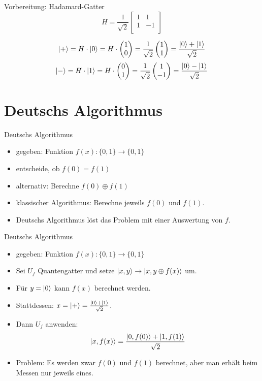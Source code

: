 \documentclass[xcolor=colortbl
,ngerman
]{beamer}
\begin{document}
\begin{frame}{Vorbereitung: Hadamard-Gatter}
    \[
        H = \frac{1}{\sqrt 2}
        \begin{bmatrix}
            1 & 1 \\
            1 & -1 \\
        \end{bmatrix}
    \]

    \centerline{ \pictureHadamard }

    \[
     \left|+\right\rangle = H \cdot \left|0\right\rangle = H \cdot \begin{pmatrix} 1 \\ 0 \end{pmatrix} = \frac{1}{\sqrt 2} \begin{pmatrix} 1 \\ 1 \end{pmatrix} = \frac{\left|0\right\rangle + \left|1\right\rangle}{\sqrt 2} 
    \]
    \[
     \left|-\right\rangle = H \cdot \left|1\right\rangle = H \cdot \begin{pmatrix} 0 \\ 1 \end{pmatrix} = \frac{1}{\sqrt 2} \begin{pmatrix} 1 \\ -1 \end{pmatrix} = \frac{\left|0\right\rangle - \left|1\right\rangle}{\sqrt 2} 
    \]

\end{frame}

\section{Deutschs Algorithmus}
\begin{frame}{Deutschs Algorithmus}
    \begin{itemize}
        \item gegeben: Funktion $f(x) : \{0,1\} \rightarrow \{0,1\}$
        \item entscheide, ob $f(0) = f(1)$
        \item alternativ: Berechne $f(0) \oplus f(1)$
        \item klassischer Algorithmus: Berechne jeweils $f(0)$ und $f(1)$.
        \item Deutschs Algorithmus löst das Problem mit einer Auswertung von $f$.
    \end{itemize}
\end{frame}


\begin{frame}{Deutschs Algorithmus}
    \begin{itemize}
        \item gegeben: Funktion $f(x) : \{0,1\} \rightarrow \{0,1\}$
        \item Sei $U_f$ Quantengatter und setze $\left|x,y\right\rangle \rightarrow \left|x, y \oplus f(x)\right\rangle$ um. 
        \item Für $y = \left|0\right\rangle$ kann $f(x)$ berechnet werden.
        \item Stattdessen: $x = \left|+\right\rangle = \frac{\left|0\right\rangle + \left|1\right\rangle}{\sqrt 2}$.
        \item Dann $U_f$ anwenden: \[
                \left|x,f(x)\right\rangle = \frac{\left|0, f(0)\right\rangle + \left|1, f(1)\right\rangle}{\sqrt 2}
                \]
        \item \alert{Problem:} Es werden zwar $f(0)$ und $f(1)$ berechnet, aber man erhält beim Messen nur jeweils eines.
    \end{itemize}
\end{frame}
\end{document}

